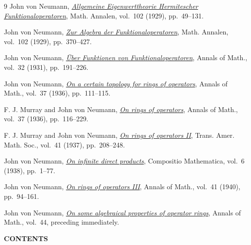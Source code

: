 \documentclass[b5paper,twoside]{article}
\theoremstyle{mvnplain}
\begin{document}
\renewcommand{\refname}{\centering\MakeUppercase{Bibliography}}
\begin{thebibliography}{9}
John von Neumann,
\href{https://doi.org/10.1007/BF01782338}{\emph{Allgemeine Eigenwerttheorie
Hermitescher Funktionaloperatoren}}, Math. Annalen, vol.~102 (1929),
pp.~49--131.

John von Neumann,
\href{https://doi.org/10.1007/BF01782352}{\emph{Zur Algebra der
Funktionaloperatoren}}, Math. Annalen, vol.~102 (1929), pp.~370--427.

John von Neumann,
\href{https://doi.org/10.2307/1968185}{\emph{\"Uber Funktionen von
Funktionaloperatoren}}, Annals of Math., vol.~32 (1931), pp.~191--226.

John von Neumann,
\href{https://doi.org/10.2307/1968692}{\emph{On a certain topology for rings
of operators}}, Annals of Math., vol.~37 (1936), pp.~111--115.

F. J. Murray and John von Neumann,
\href{https://doi.org/10.2307/1968693}{\emph{On rings of operators}}, Annals
of Math., vol.~37 (1936), pp.~116--229.

F. J. Murray and John von Neumann,
\href{https://doi.org/10.1090/S0002-9947-1937-1501899-4}{\emph{On rings of
operators II}}, Trans. Amer. Math. Soc., vol.~41 (1937), pp.~208--248.

John von Neumann,
\href{https://www.numdam.org/item/CM_1939__6__1_0/}{\emph{On infinite direct
products}}, Compositio Mathematica, vol.~6 (1938), pp.~1--77.

John von Neumann,
\href{https://doi.org/10.2307/1968823}{\emph{On rings of operators III}},
Annals of Math., vol.~41 (1940), pp.~94--161.

John von Neumann,
\href{https://doi.org/10.2307/1969106}{\emph{On some algebraical properties
of operator rings}}, Annals of Math., vol.~44, preceding immediately.
\end{thebibliography}

\label{contents}
\begin{center}\bfseries\MakeUppercase{Contents}\end{center}

\newcommand{\ContentsChapter}[2]{%
  \par\noindent\hyperref[#1]{\textbf{#2}}\par}
\newcommand{\ContentsSection}[3]{%
  \par\hangindent=2.8em\hangafter=1\noindent\hspace*{1.5em}%
  \hyperref[#1]{\S#2\quad #3}\par}
\newcommand{\ContentsStatement}[3]{%
  \par\hangindent=4.7em\hangafter=1\noindent\hspace*{3.3em}%
  \hyperref[#1]{#2.\quad #3}\par}
\end{document}

